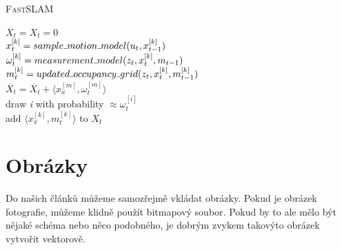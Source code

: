 \documentclass[a4paper, 11pt]{article}
\begin{document}
\begin{algorithm} \label{Algoritmus1}
    \caption{\textsc{FastSLAM}}
    \SetNlSty{}{}{:}
    
    $\overline{X_t} = X_t = 0$ \\
    {
        $x_t^{[k]} = sample\mathunderscore motion\mathunderscore model(u_t, x_{t - 1}^{[k]})$ \\
        $\omega_t^{[k]} = measurement\mathunderscore model(z_t, x_t^{[k]}, m_{t - 1})$ \\
        $m_t^{[k]} = updated\mathunderscore occupancy\mathunderscore grid(z_t, x_t^{[k]}, m_{t - 1}^{[k]})$ \\
        $\overline{X_t} = \overline{X_t} + \langle x_x^{[m]}, \omega_t^{[m]} \rangle$ \\
    }
    {
        draw \emph{i} with probability $\approx \omega_t^{[i]}$ \\
        add $\langle x_x^{[k]}, m_t^{[k]} \rangle$ to $X_t$
    }
\end{algorithm}

\section{Obrázky}

Do našich článků můžeme samozřejmě vkládat obrázky. Pokud je obrázek fotografie, můžeme klidně použít bitmapový soubor. Pokud by to ale mělo být nějaké schéma nebo něco podobného, je dobrým zvykem takovýto obrázek vytvořit vektorově.
\end{document}
